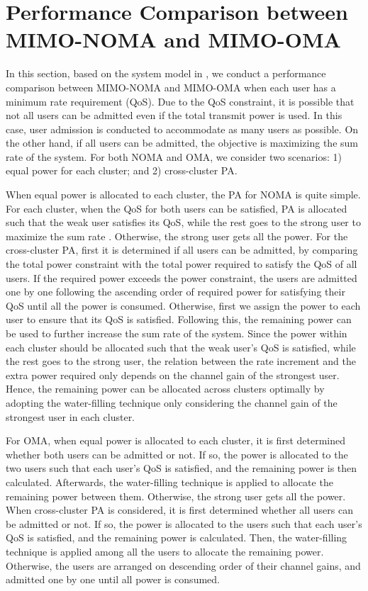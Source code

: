 \documentclass[10pt,final,journal,a4paper,twoside,twocolumn,romanappendices]{IEEEtran}
\theoremstyle{myremark}
\theoremstyle{myremark}
\begin{document}
{\color{black}
\section{Performance Comparison between MIMO-NOMA and MIMO-OMA}
In this section, based on the system model in \cite{8}, we conduct a performance comparison between MIMO-NOMA and MIMO-OMA when each user has a minimum rate requirement (QoS). Due to the QoS constraint, it is possible that not all users can be admitted even if the total transmit power is used. In this case, user admission is conducted to accommodate as many users as possible. On the other hand, if all users can be admitted, the objective is maximizing the sum rate of the system. For both NOMA and OMA, we consider two scenarios: 1) equal power for each cluster; and 2) cross-cluster PA. 

When equal power is allocated to each cluster, the PA for NOMA is quite simple. For each cluster, when the QoS for both users can be satisfied, PA is allocated such that the weak user satisfies its QoS, while the rest goes to the strong user to maximize the sum rate \cite{31}. Otherwise, the strong user gets all the power.
For the cross-cluster PA, first it is determined if all users can be admitted, by comparing the total power constraint with the total power required to satisfy the QoS of all users. If the required power exceeds the power constraint, the users are admitted one by one following the ascending order of required power for satisfying their QoS until all the power is consumed. Otherwise, first we assign the power to each user to ensure that its QoS is satisfied. Following this, the remaining power can be used to further increase the sum rate of the system. Since the power within each cluster should be allocated such that the weak user's QoS is satisfied, while the rest goes to the strong user, the relation between the rate increment and the extra power required only depends on the channel gain of the strongest user. Hence, the remaining power can be allocated across clusters optimally by adopting the water-filling technique only considering the channel gain of the strongest user in each cluster.  

For OMA, when equal power is allocated to each cluster, it is first determined whether both users can be admitted or not. If so, the power is allocated to the two users such that each user's QoS is satisfied, and the remaining power is then calculated. Afterwards, the water-filling technique is applied to allocate the remaining power between them. Otherwise, the strong user gets all the power. When cross-cluster PA is considered, it is first determined whether all users can be admitted or not. If so, the power is allocated to the users such that each user's QoS is satisfied, and the remaining power is calculated. Then, the water-filling technique is applied among all the users to allocate the remaining power. Otherwise, the users are arranged on descending order of their channel gains, and admitted one by one until all power is consumed.  

}
\end{document}
